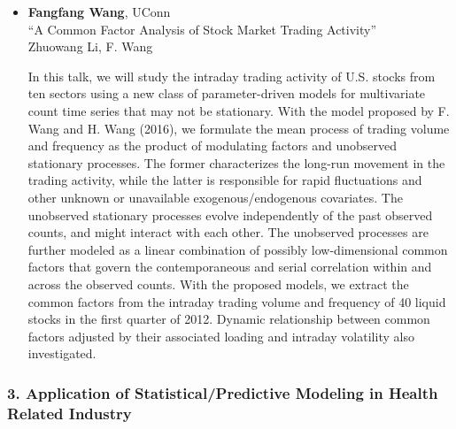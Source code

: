 \begin{itemize}
\item \textbf{Fangfang Wang}, UConn \\
``A Common Factor Analysis of Stock Market Trading Activity'' \\
Zhuowang Li, F. Wang


In this talk, we will study the intraday trading activity of U.S. stocks from ten sectors using a new class of parameter-driven models for multivariate count time series that may not be stationary. With the  model proposed by F. Wang and H. Wang (2016), we formulate the mean process of trading volume and frequency as the product of modulating factors and unobserved stationary processes. The former characterizes the long-run movement in the trading activity, while the latter is responsible for rapid fluctuations and other unknown or unavailable exogenous/endogenous covariates. The unobserved stationary processes evolve independently of the past observed counts, and might interact with each other. The unobserved processes are further modeled as a linear combination of possibly low-dimensional common factors that govern the contemporaneous and serial correlation within and across the observed counts. With the proposed models, we extract the common factors from the intraday trading volume and  frequency of 40 liquid stocks in the first quarter of 2012. Dynamic relationship between common factors adjusted by their associated loading and intraday volatility also investigated.   

\end{itemize}

\subsubsection*{3. Application of Statistical/Predictive Modeling in Health Related Industry}

